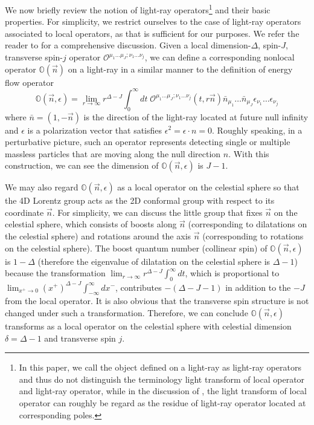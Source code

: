 \documentclass[letterpaper,11pt]{article}
\def\beq{\begin{equation}}
\def\eeq{\end{equation}}
\def\beq{\begin{equation}}
\def\eeq{\end{equation}}
\begin{document}
We now briefly review the notion of light-ray operators\footnote{In this paper, we call the object defined on a light-ray as light-ray operators and thus do not distinguish the terminology light transform of local operator and light-ray operator, while in the discussion of \cite{Kravchuk:2018htv}, the light transform of local operator can roughly be regard as the residue of light-ray operator located at corresponding poles.} and their basic properties. For simplicity, we restrict ourselves to the case of light-ray operators associated to local operators, as that is sufficient for our purposes. We refer the reader to \cite{Kravchuk:2018htv} for a comprehensive discussion. Given a local dimension-$\Delta$, spin-$J$, transverse spin-$j$ operator $\mathcal{O}^{\mu_1\dots\mu_J;\nu_1\dots\nu_j}$, we can define a corresponding nonlocal operator $\mathbb{O}(\vec{n})$ on a light-ray in a similar manner to the definition of energy flow operator
\beq
\mathbb{O}(\vec{n},\epsilon)=\lim_{r\to \infty} r^{\Delta-J}\int_{0}^{\infty}\! dt\; \mathcal{O}^{\mu_1\dots\mu_J;\nu_1\dots\nu_j}(t,r\vec{n})\bar{n}_{\mu_1}\dots\bar{n}_{\mu_J}\epsilon_{\nu_1}\dots\epsilon_{\nu_j}
\eeq
where $\bar{n}=(1,-\vec{n})$ is the direction of the light-ray located at future null infinity and $\epsilon$ is a polarization vector that satisfies $\epsilon^2=\epsilon\cdot n = 0$. Roughly speaking, in a perturbative picture, such an operator represents detecting single or multiple massless particles that are moving along the null direction $n$. With this construction, we can see the dimension of $\mathbb{O}(\vec{n},\epsilon)$ is $J-1$. 


We may also regard $\mathbb{O}(\vec{n},\epsilon)$ as a local operator on the celestial sphere so that the 4D Lorentz group acts as the 2D conformal group with respect to its coordinate $\vec{n}$. For simplicity, we can discuss the little group that fixes $\vec{n}$ on the celestial sphere, which consists of boosts along $\vec{n}$ (corresponding to dilatations on the celestial sphere) and rotations around the axis $\vec{n}$ (corresponding to rotations on the celestial sphere). The boost quantum number (collinear spin) of $\mathbb{O}(\vec{n},\epsilon)$ is $1-\Delta$ (therefore the eigenvalue of dilatation on the celestial sphere is $\Delta-1$) because the transformation $\displaystyle \lim_{r\to\infty} r^{\Delta-J}\int_{0}^{\infty}\! dt$, which is proportional to $\displaystyle \lim_{x^{+}\to 0}(x^+)^{\Delta-J}\int_{-\infty}^{\infty}dx^{-}$, contributes $-(\Delta-J-1)$ in addition to the  $-J$ from the local operator. It is also obvious that the transverse spin structure is not changed under such a transformation. Therefore, we can conclude $\mathbb{O}(\vec{n},\epsilon)$ transforms as a local operator on the celestial sphere with celestial dimension $\delta=\Delta-1$ and transverse spin $j$.  
\end{document}
